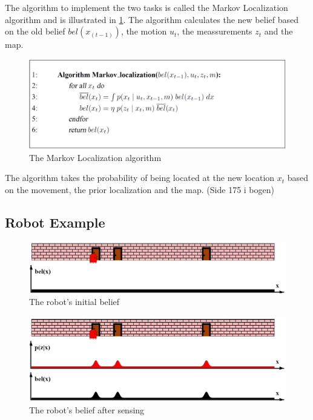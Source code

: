The algorithm to implement the two tasks is called the Markov Localization algorithm and is illustrated in \ref{fig:markovLocalization}. The algorithm calculates the new belief based on the old belief $bel(x_{(t-1)})$, the motion $u_t$, the meassurements $z_t$ and the map.

\begin{figure}[H]
\centering
\includegraphics[scale=0.25]{images/MarkovLocalization}
\caption{The Markov Localization algorithm}
\label{fig:markovLocalization}
\end{figure}

The algorithm takes the probability of being located at the new location $x_t$ based on the movement, the prior localization and the map. (Side 175 i bogen)

\subsection{Robot Example}

\begin{figure}[H]
\centering
\includegraphics[scale=0.37]{images/MarkovLocalizationA}
\caption{The robot's initial belief}
\label{fig:initialBelief}
\end{figure}

\begin{figure}[H]
\centering
\includegraphics[scale=0.37]{images/MarkovLocalizationB}
\caption{The robot's belief after sensing}
\label{fig:afterSenseBelief}
\end{figure}

